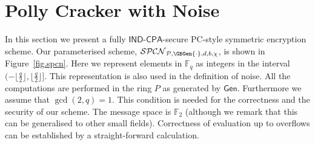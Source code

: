 \documentclass[draft]{llncs}
\newcommand{\ring}[1]{\mathbb{#1}}
\newcommand{\F}{\ensuremath{\ring{F}}\xspace}
\newcommand{\Gen}{\mathsf{Gen}}
\newcommand{\IND}{\mathsf{IND}}
\newcommand{\CPA}{\mathsf{CPA}}
\begin{document}
\vspace{-4mm} \section{Polly Cracker with Noise} \vspace{-2mm} \label{sec:noisypollycracker}
In this section we present a fully $\IND\mbox{-}\CPA$-secure PC-style symmetric encryption scheme.
Our parameterised scheme, $\mathcal{SPCN}_{\mathcal{P},\GBGen{\cdot},d,b,\chi}$, is shown in Figure~\ref{fig.spcn}. Here we represent elements in $\F_q$ as integers in the interval $(-\lfloor \frac{q}{2} \rfloor, \lfloor \frac{q}{2} \rfloor]$. This representation is also used in the definition of noise. All the computations are performed in the ring $P$ as generated by $\Gen$. Furthermore we assume that $\gcd(2,q)=1$. This condition is needed for the correctness and the security of our scheme. The message space is $\F_2$ (although we remark that this can be generalised to other small fields). Correctness of evaluation up to overflows can be established by a straight-forward calculation.
\end{document}
